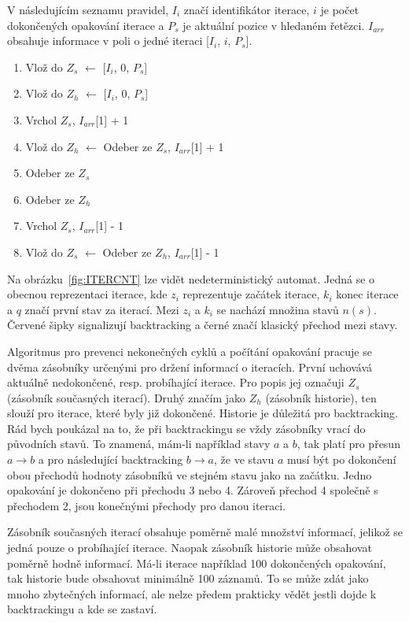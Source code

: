 V následujícím seznamu pravidel, $I_i$ značí identifikátor iterace, $i$ je počet dokončených opakování iterace a $P_s$ je aktuální pozice v hledaném řetězci.
$I_{arr}$ obsahuje informace v poli o jedné iteraci [$I_i$, $i$, $P_s$].

\begin{enumerate}[label=\arabic* --]
	\item Vlož do $Z_s$ $\longleftarrow$ [$I_i$, 0, $P_s$]
	\item Vlož do $Z_h$ $\longleftarrow$ [$I_i$, 0, $P_s$]
	\item Vrchol $Z_s$, $I_{arr}$[1] + 1
	\item Vlož do $Z_h$ $\longleftarrow$ Odeber ze $Z_s$, $I_{arr}$[1] + 1
	\item Odeber ze $Z_s$
	\item Odeber ze $Z_h$
	\item Vrchol $Z_s$, $I_{arr}$[1] - 1
	\item Vlož do $Z_s$ $\longleftarrow$ Odeber ze $Z_h$, $I_{arr}$[1] - 1
\end{enumerate}

Na obrázku~\ref{fig:ITERCNT} lze vidět nedeterministický automat. 
Jedná se o obecnou reprezentaci iterace, kde $z_i$ reprezentuje začátek iterace, $k_i$ konec iterace a $q$ značí první stav za iterací.
Mezi $z_i$ a $k_i$ se nachází množina stavů $n(s)$.
Červené šipky signalizují backtracking a černé značí klasický přechod mezi stavy.

Algoritmus pro prevenci nekonečných cyklů a počítání opakování pracuje se dvěma zásobníky určenými pro držení informací o iteracích. 
První uchovává aktuálně nedokončené, resp. probíhající iterace. 
Pro popis jej označuji $Z_s$ (zásobník současných iterací).
Druhý značím jako $Z_h$ (zásobník historie), ten slouží pro iterace, které byly již dokončené.
Historie je důležitá pro backtracking.
Rád bych poukázal na to, že při backtrackingu se vždy zásobníky vrací do původních stavů. 
To znamená, mám-li například stavy $a$ a $b$, tak platí pro přesun $a \rightarrow b$ a pro následující backtracking $b \rightarrow a$, že ve stavu $a$ musí být po dokončení obou přechodů hodnoty zásobníků ve stejném stavu jako na začátku.
Jedno opakování je dokončeno při přechodu 3 nebo 4. 
Zároveň přechod 4 společně s přechodem 2, jsou konečnými přechody pro danou iteraci.

Zásobník současných iterací obsahuje poměrně malé množství informací, jelikož se jedná pouze o probíhající iterace.
Naopak zásobník historie může obsahovat poměrně hodně informací. 
Má-li iterace například 100 dokončených opakování, tak historie bude obsahovat minimálně 100 záznamů.
To se může zdát jako mnoho zbytečných informací, ale nelze předem prakticky vědět jestli dojde k backtrackingu a kde se zastaví.

